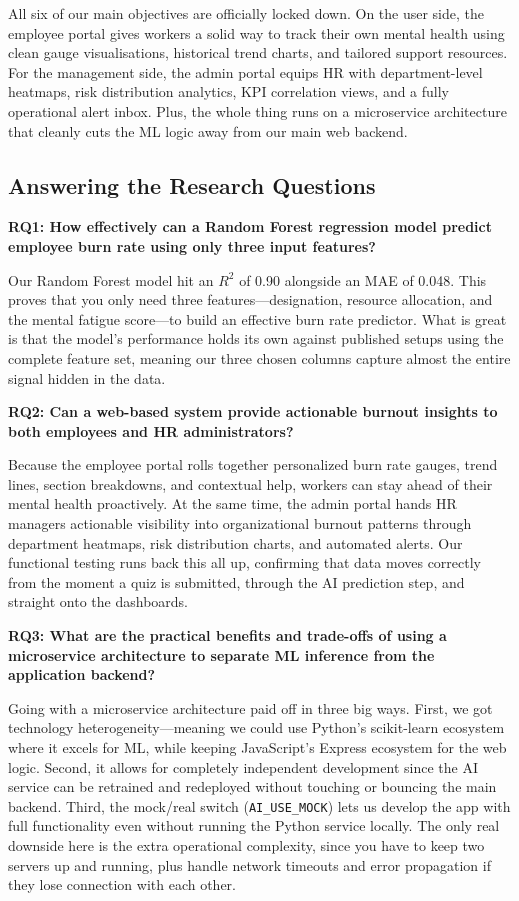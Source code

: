 \documentclass[12pt,a4paper]{article}
\begin{document}
All six of our main objectives are officially locked down. On the user side, the employee portal gives workers a solid way to track their own mental health using clean gauge visualisations, historical trend charts, and tailored support resources. For the management side, the admin portal equips HR with department-level heatmaps, risk distribution analytics, KPI correlation views, and a fully operational alert inbox. Plus, the whole thing runs on a microservice architecture that cleanly cuts the ML logic away from our main web backend.

\subsection{Answering the Research Questions}

\textbf{RQ1: How effectively can a Random Forest regression model predict
employee burn rate using only three input features?}

Our Random Forest model hit an $R^{2}$ of 0.90 alongside an MAE of 0.048. This proves that you only need three features—designation, resource allocation, and the mental fatigue score—to build an effective burn rate predictor. What is great is that the model's performance holds its own against published setups using the complete feature set, meaning our three chosen columns capture almost the entire signal hidden in the data.

\textbf{RQ2: Can a web-based system provide actionable burnout insights to
both employees and HR administrators?}

Because the employee portal rolls together personalized burn rate gauges, trend lines, section breakdowns, and contextual help, workers can stay ahead of their mental health proactively. At the same time, the admin portal hands HR managers actionable visibility into organizational burnout patterns through department heatmaps, risk distribution charts, and automated alerts. Our functional testing runs back this all up, confirming that data moves correctly from the moment a quiz is submitted, through the AI prediction step, and straight onto the dashboards.

\textbf{RQ3: What are the practical benefits and trade-offs of using a
microservice architecture to separate ML inference from the application
backend?}

Going with a microservice architecture paid off in three big ways. First, we got technology heterogeneity—meaning we could use Python's scikit-learn ecosystem where it excels for ML, while keeping JavaScript's Express ecosystem for the web logic. Second, it allows for completely independent development since the AI service can be retrained and redeployed without touching or bouncing the main backend. Third, the mock/real switch (\texttt{AI\_USE\_MOCK}) lets us develop the app with full functionality even without running the Python service locally. The only real downside here is the extra operational complexity, since you have to keep two servers up and running, plus handle network timeouts and error propagation if they lose connection with each other.
\end{document}
